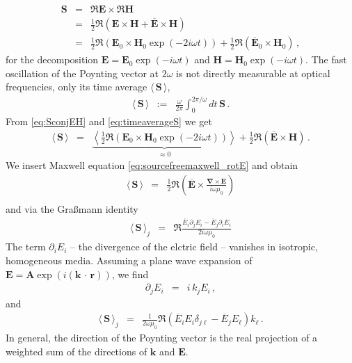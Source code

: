 \documentclass[12pt,a4paper,twoside,openright,BCOR10mm,headsepline,titlepage,abstracton,chapterprefix,final]{scrreprt}
\newcommand\Vector[1]{{\mathbf{#1}}}
\newcommand\vacuum{0}
\newcommand\Location{\Vector{r}}
\newcommand\wavenumber{k}
\newcommand\Wavevector{\Vector{\wavenumber}}
\newcommand\Nabla{\Vector{\nabla}}
\newcommand{\scpm}[2]{(#1\,\cdot\,#2)}
\newcommand\scalarEfield{E}
\newcommand\scalarHfield{H}
\newcommand\Efield{\Vector{\scalarEfield}}
\newcommand\Hfield{\Vector{\scalarHfield}}
\newcommand\vacuumpermeability{\scalarpermeability_{\vacuum}}
\newcommand\scalarpermeability{\mu}
\newcommand{\timeavg}[1]{{\langle\,#1\,\rangle}}
\begin{document}
\begin{eqnarray}
 \Vector{S} &=& \Re \Efield \times \Re \Hfield \nonumber \\
            &=& \frac{1}{2} \Re ( \Efield \times \Hfield + \overline{\Efield} \times \Hfield ) \nonumber \\
            &=& \frac{1}{2} \Re ( \Efield_0 \times \Hfield_0 \exp(-2i\omega t) )
	      + \frac{1}{2} \Re ( \overline{\Efield}_0 \times \Hfield_0 ) \label{eq:SconjEH}\,,
\end{eqnarray}
for the decomposition $\Efield = \Efield_0 \exp(-i\omega t)$ and $\Hfield = \Hfield_0 \exp(-i\omega t)$.
The fast oscillation of the Poynting vector at $2 \omega$ is not directly measurable at optical frequencies, only its time average $\timeavg{\Vector{S}}$,
\begin{eqnarray}
 \timeavg{\Vector{S}}  &:=& \frac{\omega}{2\pi} \int_{0}^{2\pi / \omega} dt \, \Vector{S} \label{eq:timeaverageS}\,.
\end{eqnarray}
From \eqref{eq:SconjEH} and \eqref{eq:timeaverageS} we get
\begin{eqnarray}
  \timeavg{\Vector{S}}   &=& \underbrace{\left\langle \frac{1}{2} \Re ( \Efield_0 \times \Hfield_0 \exp(-2i\omega t) )\right\rangle}_{\approx0} + \frac{1}{2} \Re ( \overline{\Efield} \times \Hfield )\,.
\end{eqnarray}
We insert Maxwell equation \eqref{eq:sourcefreemaxwell_rotE} and obtain
\begin{eqnarray}
 \timeavg{\Vector{S}}   &=& \frac{1}{2} \Re \left( \overline{\Efield} \times \frac{\Nabla \times \Efield}{i \omega \vacuumpermeability} \right) \\
\end{eqnarray}
and via the Gra\ss mann identity 
\begin{eqnarray}
  \timeavg{\Vector{S}}_j &=&  \Re \frac{ \overline{\scalarEfield}_i \partial_j \scalarEfield_i - \overline{\scalarEfield}_j \partial_i \scalarEfield_i }{2 i \omega \vacuumpermeability}
\end{eqnarray}
The term $\partial_i \scalarEfield_i$ -- the divergence of the elctric field -- vanishes in isotropic, homogeneous media.
Assuming a plane wave expansion of $\Efield = \Vector{A} \exp(i \scpm{\Vector{k}}{\Location})$, we find
\begin{eqnarray}
  \partial_j E_i &=& i\,k_j E_i\,,
\end{eqnarray}
and
\begin{eqnarray}
 \timeavg{\Vector{S}}_j &=&  
    \frac{1}{2 \omega \vacuumpermeability}\Re( 
	\overline{\scalarEfield}_i \scalarEfield_i \delta_{j\ell}  
	- \overline{\scalarEfield}_j \scalarEfield_\ell 
      ) k_\ell\,.\label{eq:poyntingvector}
\end{eqnarray}
In general, the direction of the Poynting vector is the real projection of a weighted sum of the directions of $\Wavevector$ and $\Efield$.
\end{document}
